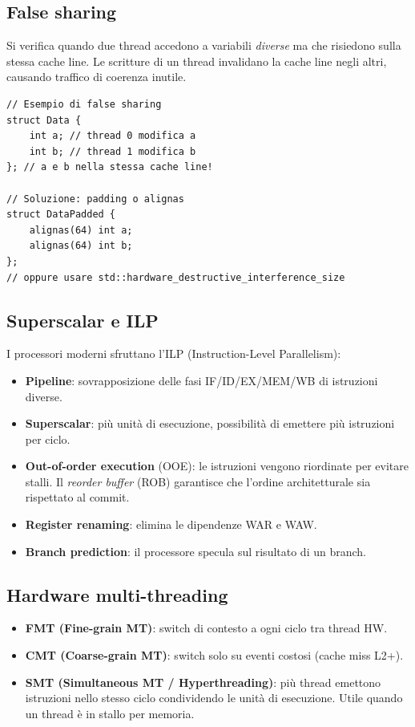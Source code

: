 \documentclass[11pt,a4paper]{article}
\theoremstyle{remark}
\begin{document}
\subsection{False sharing}

Si verifica quando due thread accedono a variabili \emph{diverse} ma che risiedono sulla stessa cache line. Le scritture di un thread invalidano la cache line negli altri, causando traffico di coerenza inutile.

\begin{lstlisting}
// Esempio di false sharing
struct Data {
    int a; // thread 0 modifica a
    int b; // thread 1 modifica b
}; // a e b nella stessa cache line!

// Soluzione: padding o alignas
struct DataPadded {
    alignas(64) int a;
    alignas(64) int b;
};
// oppure usare std::hardware_destructive_interference_size
\end{lstlisting}

\subsection{Superscalar e ILP}

I processori moderni sfruttano l'ILP (Instruction-Level Parallelism):
\begin{itemize}
  \item \textbf{Pipeline}: sovrapposizione delle fasi IF/ID/EX/MEM/WB di istruzioni diverse.
  \item \textbf{Superscalar}: più unità di esecuzione, possibilità di emettere più istruzioni per ciclo.
  \item \textbf{Out-of-order execution} (OOE): le istruzioni vengono riordinate per evitare stalli. Il \emph{reorder buffer} (ROB) garantisce che l'ordine architetturale sia rispettato al commit.
  \item \textbf{Register renaming}: elimina le dipendenze WAR e WAW.
  \item \textbf{Branch prediction}: il processore specula sul risultato di un branch.
\end{itemize}

\subsection{Hardware multi-threading}

\begin{itemize}
  \item \textbf{FMT (Fine-grain MT)}: switch di contesto a ogni ciclo tra thread HW.
  \item \textbf{CMT (Coarse-grain MT)}: switch solo su eventi costosi (cache miss L2+).
  \item \textbf{SMT (Simultaneous MT / Hyperthreading)}: più thread emettono istruzioni nello stesso ciclo condividendo le unità di esecuzione. Utile quando un thread è in stallo per memoria.
\end{itemize}
\end{document}
